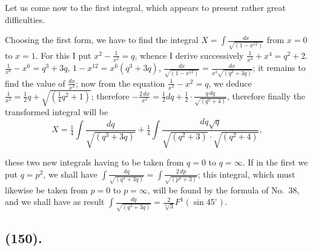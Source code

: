 \documentclass{article}
\begin{document}
Let us come now to the first integral, which appears to present rather great difficulties.

Choosing the first form, we have to find the integral $X=\displaystyle\int\frac{dx}{\sqrt{(1-x^{12})}}$ from $x=0$ to $x=1$. For this I put $x^{2}-\frac{1}{x^{2}}=q$, whence I derive successively $\frac{1}{x^{4}}+x^{4}=q^{2}+2$. $\frac{1}{x^{6}}-x^{6}=q^{3}+3q$, $1-x^{12}=x^{6}(q^{3}+3q)$, $\frac{dx}{\sqrt{(1-x^{12})}}=\frac{dx}{x^{3}\sqrt{(q^{3}+3q)}}$; it remains to find the value of $\frac{dx}{x^{3}}$; now from the equation $\frac{1}{x^{2}}-x^{2}=q$, we deduce $\frac{1}{x^{2}}=\frac{1}{2}q+\sqrt{(\frac{1}{4}q^{2}+1)}$; therefore $-\frac{2\,dx}{x^{3}}=\frac{1}{2}dq+\frac{1}{2}\cdot\frac{q\,dq}{\sqrt{(q^{2}+4)}}$, therefore finally the transformed integral will be
\[ X=\tfrac{1}{4}\int\frac{dq}{\sqrt{(q^{3}+3q)}}+\tfrac{1}{4}\int\frac{dq\sqrt{q}}{\sqrt{(q^{2}+3)}\cdot\sqrt{(q^{2}+4)}}, \]

these two new integrals having to be taken from $q=0$ to $q=\infty$. If in the first we put $q=p^{2}$, we shall have $\displaystyle\int\frac{dq}{\sqrt{(q^{3}+3q)}}=\int\frac{2\,dp}{\sqrt{(p^{4}+3)}}$; this integral, which must likewise be taken from $p=0$ to $p=\infty$, will be found by the formula of No.~38, and we shall have as result $\displaystyle\int\frac{dq}{\sqrt{(q^{3}+3q)}}=\frac{2}{\sqrt[4]{3}}F^{1}(\sin 45^{\circ})$.

\subsection*{(150).}
\end{document}
